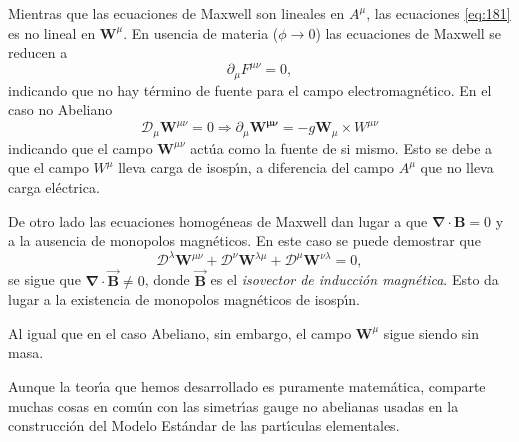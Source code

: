 Mientras que las ecuaciones de Maxwell son lineales en $A^\mu$, las ecuaciones \eqref{eq:181} es no lineal en $\mathbf{W}^\mu$. En usencia de materia ($\phi\to0$) las ecuaciones de Maxwell se reducen a
\begin{equation}
  \partial_\mu F^{\mu\nu}=0,
\end{equation}
indicando que no hay t\'ermino de fuente para el campo electromagn\'etico. En el caso no Abeliano
\begin{equation}
  \mathcal{D}_\mu\mathbf{W}^{\mu\nu}=0 \Rightarrow \partial_\mu\mathbf{W^{\mu\nu}}=-g\mathbf{W}_\mu\times W^{\mu\nu}
\end{equation}
indicando que el campo $\mathbf{W}^{\mu\nu}$ act\'ua como la fuente de si mismo. Esto se debe a que el campo $W^{\mu}$ lleva carga de isosp\'\i n, a diferencia del campo $A^{\mu}$ que no lleva carga el\'ectrica. 

De otro lado las ecuaciones homog\'eneas de Maxwell dan lugar a que $\boldsymbol{\nabla}\cdot\mathbf{B}=0$ y a la ausencia de monopolos magn\'eticos. En este caso se puede demostrar que
\begin{equation}
  \mathcal{D}^\lambda\mathbf{W}^{\mu\nu}+  \mathcal{D}^\nu\mathbf{W}^{\lambda\mu}+  \mathcal{D}^\mu\mathbf{W}^{\nu\lambda}=0,
\end{equation}
se sigue que $\boldsymbol{\nabla}\cdot\vec{\mathbf{B}}\neq0$, donde $\vec{\mathbf{B}}$ es el \emph{isovector de inducci\'on magn\'etica}. Esto da lugar a la existencia de monopolos magn\'eticos de isosp\'\i n. 

Al igual que en el caso Abeliano, sin embargo, el campo $\mathbf{W}^\mu$ sigue siendo sin masa. 

Aunque la teor\'\i a que hemos desarrollado es puramente matem\'atica, comparte muchas cosas en com\'un con las simetr\'\i as gauge no abelianas usadas en la construcci\'on del Modelo Est\'andar de las part\'\i culas elementales.




